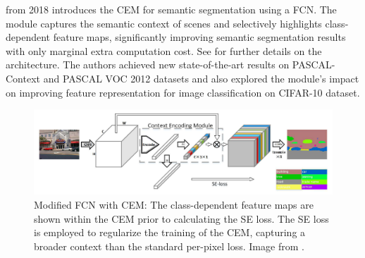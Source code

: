  \cite{https://doi.org/10.48550/arxiv.1803.08904} from 2018 introduces the \acf{CEM}  for semantic segmentation using a \acf{FCN}. The module captures the semantic context of scenes and selectively highlights class-dependent feature maps, significantly improving semantic segmentation results with only marginal extra computation cost. See  for further details on the architecture. The authors achieved new state-of-the-art results on PASCAL-Context \cite{everingham2015pascal} and PASCAL VOC 2012 \cite{pascal-voc-2012} datasets and also explored the module's impact on improving feature representation for image classification on CIFAR-10 \cite{cifar10dataset} dataset.

\begin{figure}[H]%
    \centering
    \includegraphics[width=\imgWidthXL]{images/context_encoding_module.png}
    \caption[Architecture based on \acf{CEM}]{Modified \ac{FCN} with \acf{CEM}: The class-dependent feature maps are shown within the \ac{CEM} prior to calculating the SE loss. The SE loss is employed to regularize the training of the \ac{CEM}, capturing a broader context than the standard per-pixel loss. Image from \cite{https://doi.org/10.48550/arxiv.1803.08904}.}
    \label{context_encoding_module}
\end{figure}

